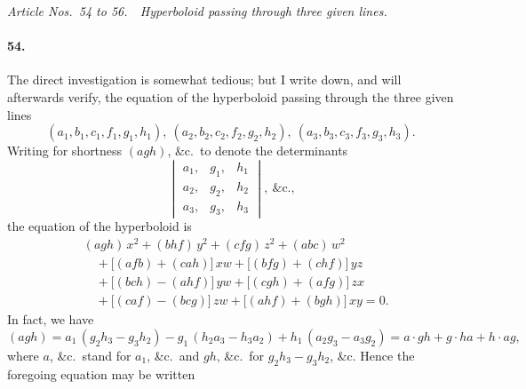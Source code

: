 \documentclass[11pt,a4paper]{article}
\begin{document}
\bigskip
\begin{center}
\textit{Article Nos.\ 54 to 56.\ \ Hyperboloid passing through three given lines.}
\end{center}

\paragraph{54.}
The direct investigation is somewhat tedious; but I write down, and will
afterwards verify, the equation of the hyperboloid passing through the three given lines
\[
(a_1, b_1, c_1, f_1, g_1, h_1),\ (a_2, b_2, c_2, f_2, g_2, h_2),\ (a_3, b_3, c_3, f_3, g_3, h_3).
\]
Writing for shortness $(agh)$, \&c.\ to denote the determinants
\[
\begin{vmatrix}
a_1, & g_1, & h_1 \\
a_2, & g_2, & h_2 \\
a_3, & g_3, & h_3
\end{vmatrix},\ \&\text{c.,}
\]
the equation of the hyperboloid is
\begin{align*}
&(agh)\,x^2 + (bhf)\,y^2 + (cfg)\,z^2 + (abc)\,w^2 \\
&\quad{}+ \bigl[(afb) + (cah)\bigr]\,xw + \bigl[(bfg) + (chf)\bigr]\,yz \\
&\quad{}+ \bigl[(bch) - (ahf)\bigr]\,yw + \bigl[(cgh) + (afg)\bigr]\,zx \\
&\quad{}+ \bigl[(caf) - (bcg)\bigr]\,zw + \bigl[(ahf) + (bgh)\bigr]\,xy = 0.
\end{align*}
In fact, we have
\[
(agh) = a_1\,(g_2 h_3 - g_3 h_2) - g_1\,(h_2 a_3 - h_3 a_2) + h_1\,(a_2 g_3 - a_3 g_2)
       = a\cdot gh + g\cdot ha + h\cdot ag,
\]
where $a$, \&c.\ stand for $a_1$, \&c.\ and $gh$, \&c.\ for $g_2 h_3 - g_3 h_2$, \&c. Hence the
foregoing equation may be written
\end{document}

